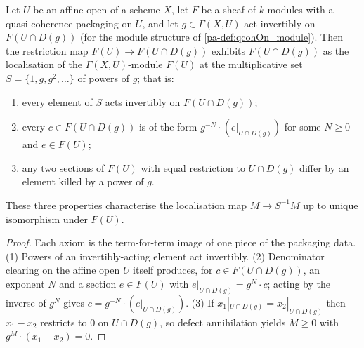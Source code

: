 \begin{theorem}
  \label{pa-thm:qcohOn_isLocalizedModule}
  \leanok

  Let \(U\) be an affine open of a scheme \(X\), let \(F\) be a sheaf of \(k\)-modules with
  a quasi-coherence packaging on \(U\), and let \(g \in \Gamma(X, U)\) act invertibly on
  \(F(U \cap D(g))\) (for the module structure of \ref{pa-def:qcohOn_module}). Then the
  restriction map \(F(U) \to F(U \cap D(g))\) exhibits \(F(U \cap D(g))\) as the
  localisation of the \(\Gamma(X, U)\)-module \(F(U)\) at the multiplicative set
  \(S = \{1, g, g^2, \dots\}\) of powers of \(g\); that is:
  \begin{enumerate}
    \item every element of \(S\) acts invertibly on \(F(U \cap D(g))\);
    \item every \(c \in F(U \cap D(g))\) is of the form \(g^{-N} \cdot (e|_{U \cap D(g)})\)
      for some \(N \ge 0\) and \(e \in F(U)\);
    \item any two sections of \(F(U)\) with equal restriction to \(U \cap D(g)\) differ by
      an element killed by a power of \(g\).
  \end{enumerate}
  These three properties characterise the localisation map \(M \to S^{-1}M\) up to unique
  isomorphism under \(F(U)\).
\end{theorem}
\begin{proof}
  \leanok
  Each axiom is the term-for-term image of one piece of the packaging data. (1) Powers of
  an invertibly-acting element act invertibly. (2) Denominator clearing on the affine open
  \(U\) itself produces, for \(c \in F(U \cap D(g))\), an exponent \(N\) and a section
  \(e \in F(U)\) with \(e|_{U \cap D(g)} = g^N \cdot c\); acting by the inverse of
  \(g^N\) gives \(c = g^{-N} \cdot (e|_{U \cap D(g)})\). (3) If
  \(x_1|_{U \cap D(g)} = x_2|_{U \cap D(g)}\) then \(x_1 - x_2\) restricts to \(0\) on
  \(U \cap D(g)\), so defect annihilation yields \(M \ge 0\) with
  \(g^M \cdot (x_1 - x_2) = 0\).
\end{proof}

